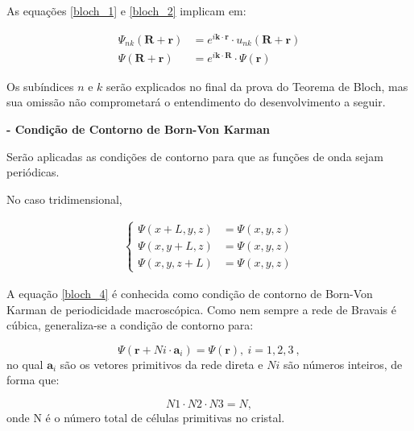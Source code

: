 	As equações \eqref{bloch_1} e \eqref{bloch_2} implicam em:

	\begin{align}
		\label{bloch_3}
		\Psi_{nk}(\mathbf{R} + \mathbf{r}) &= e^{i\mathbf{k} \cdot \mathbf{r}}\cdot u_{nk}(\mathbf{R} + \mathbf{r})\\
		\Psi(\mathbf{R} + \mathbf{r}) &= e^{i\mathbf{k} \cdot \mathbf{R}}\cdot \Psi(\mathbf{r})
	\end{align}

	\par Os subíndices $n$ e $k$ serão explicados no final da prova do Teorema de Bloch, mas sua omissão não comprometará o entendimento do desenvolvimento a seguir.


	\par \textbf{- Condição de Contorno de Born-Von Karman}

		\par Serão aplicadas as condições de contorno para que as funções de onda sejam periódicas.
		
		\par No caso tridimensional,

		\begin{align}\label{bloch_4}
	        \left\{
	          \begin{array}{ll}
	            \displaystyle \Psi(x+L, y, z) &= \Psi(x, y, z)\\
	            \displaystyle \Psi(x, y+L, z) &= \Psi(x, y, z)\\
	            \displaystyle \Psi(x, y, z+L) &= \Psi(x, y, z)
	          \end{array}
	        \right.
	      \end{align}
		
		\par A equação \eqref{bloch_4} é conhecida como condição de contorno de Born-Von Karman de periodicidade macroscópica.  Como nem sempre a rede de Bravais é cúbica, generaliza-se a condição de contorno para:

		\begin{equation}
			\label{blochh_5}
			\Psi(\mathbf{r} + N i\cdot \mathbf{a}_{i}) = \Psi(\mathbf{r}),\ i=1,2,3\ ,
		\end{equation}
		no qual $\mathbf{a}_{i}$ são os vetores primitivos da rede direta e $Ni$ são números inteiros, de forma que:

		\begin{equation}
			\label{bloch_6}
			N1 \cdot N2 \cdot N3 = N,
		\end{equation}
		onde N é o número total de células primitivas no cristal.

